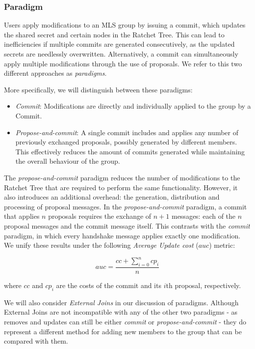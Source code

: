 \documentclass[preprint, 12pt]{elsarticle}
\begin{document}
\subsubsection{Paradigm}

Users apply modifications to an MLS group by issuing a commit, which updates the shared secret and certain nodes in the Ratchet Tree. This can lead to inefficiencies if multiple commits are generated consecutively, as the updated secrets are needlessly overwritten. Alternatively, a commit can simultaneously apply multiple modifications through the use of proposals. We refer to this two different approaches as \textit{paradigms}.

More specifically, we will distinguish between these paradigms:

\begin{itemize}
    \item \textit{Commit}: Modifications are directly and individually applied to the group by a Commit.
    \item \textit{Propose-and-commit}: A single commit includes and applies any number of previously exchanged proposals, possibly generated by different members. This effectively reduces the amount of commits generated while maintaining the overall behaviour of the group.
\end{itemize}

The \textit{propose-and-commit} paradigm reduces the number of modifications to the Ratchet Tree that are required to perform the same functionality. However, it also introduces an additional overhead: the generation, distribution and processing of proposal messages. In the \textit{propose-and-commit} paradigm, a commit that applies $n$ proposals requires the exchange of $n + 1$ messages: each of the $n$ proposal messages and the commit message itself. This contrasts with the \textit{commit} paradigm, in which every handshake message applies exactly one modification. We unify these results under the following \textit{Average Update cost} ($auc$) metric:

\[ auc = \frac{cc + \sum_{i=0}^{n} cp_i}{n} \]

where $cc$ and $cp_i$ are the costs of the commit and its $i$th proposal, respectively.

We will also consider \textit{External Joins} in our discussion of paradigms. Although External Joins are not incompatible with any of the other two paradigms - as removes and updates can still be either \textit{commit} or \textit{propose-and-commit} - they do represent a different method for adding new members to the group that can be compared with them.
\end{document}
